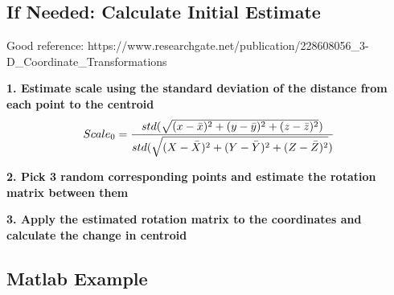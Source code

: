 \subsection{If Needed: Calculate Initial Estimate}
Good reference: https://www.researchgate.net/publication/228608056\_3-D\_Coordinate\_Transformations
\vspace{0.5cm}

\noindent
\textbf{1. Estimate scale using the standard deviation of the distance from each point to the centroid}
\[
Scale_0 = \dfrac{std(\sqrt{(x-\bar{x})^2+(y-\bar{y})^2+(z-\bar{z})^2})}{std(\sqrt{(X-\bar{X})^2+(Y-\bar{Y})^2+(Z-\bar{Z})^2})} \\
\]
\vspace{0.5cm}

\noindent
\textbf{2. Pick 3 random corresponding points and estimate the rotation matrix between them}

\vspace{0.5cm}

\noindent
\textbf{3. Apply the estimated rotation matrix to the coordinates and calculate the change in centroid}

\subsection{Matlab Example}

